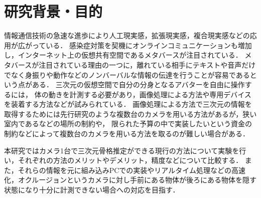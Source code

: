 \documentclass[titlepage]{jarticle}
\begin{document}
\maketitle

%
%
\section{研究背景・目的}
%
情報通信技術の急速な進歩により人工現実感，拡張現実感，複合現実感などの応用が広がっている．
感染症対策を契機にオンラインコミュニケーションも増加し，インターネット上の仮想共有空間であるメタバースが注目されている．
メタバースが注目されている理由の一つに，離れている相手にテキストや音声だけでなく身振りや動作などのノンバーバルな情報の伝達を行うことが容易であるという点がある．
三次元の仮想空間で自分の分身となるアバターを自由に操作するには，
体の動きを計測する必要があり，画像処理による方法\cite{CV}や専用デバイスを装着する方法\cite{キャプチャ}などが試みられている．
画像処理による方法で三次元の情報を取得するためには先行研究のような複数台のカメラを用いる方法\cite{turugi}があるが，狭い室内であるなどの場所の制約や，
限られた予算の中で実装したいという資金の制約などによって複数台のカメラを用いる方法を取るのが難しい場合がある．

本研究ではカメラ1台で三次元骨格推定ができる現行の方法について実験を行い，それぞれの方法のメリットやデメリット，精度などについて比較する．
また，それらの情報を元に組み込みPCでの実装やリアルタイム処理などの高速化，オクルージョンというカメラに対し手前にある物体が後ろにある物体を隠す状態になり十分に計測できない場合への対応を目指す．

\end{document}
